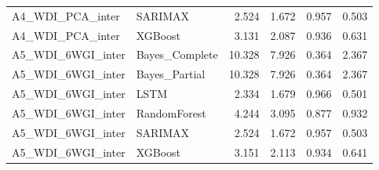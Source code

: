 \begin{table}
\begin{tabular}{llrrrr}
A4\_WDI\_PCA\_inter & SARIMAX & 2.524 & 1.672 & 0.957 & 0.503 \\
A4\_WDI\_PCA\_inter & XGBoost & 3.131 & 2.087 & 0.936 & 0.631 \\
A5\_WDI\_6WGI\_inter & Bayes\_Complete & 10.328 & 7.926 & 0.364 & 2.367 \\
A5\_WDI\_6WGI\_inter & Bayes\_Partial & 10.328 & 7.926 & 0.364 & 2.367 \\
A5\_WDI\_6WGI\_inter & LSTM & 2.334 & 1.679 & 0.966 & 0.501 \\
A5\_WDI\_6WGI\_inter & RandomForest & 4.244 & 3.095 & 0.877 & 0.932 \\
A5\_WDI\_6WGI\_inter & SARIMAX & 2.524 & 1.672 & 0.957 & 0.503 \\
A5\_WDI\_6WGI\_inter & XGBoost & 3.151 & 2.113 & 0.934 & 0.641 \\
\bottomrule
\end{tabular}
\end{table}
